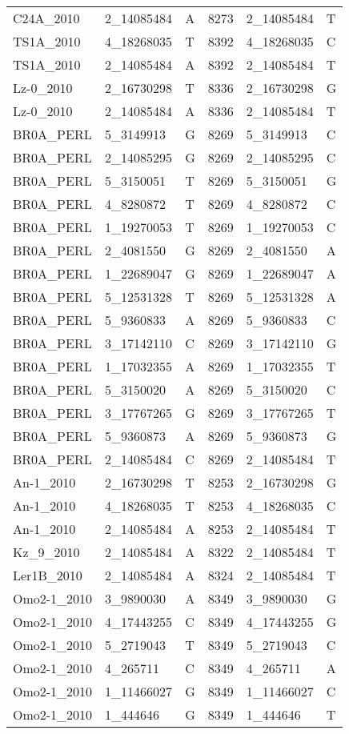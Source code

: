\begin{center}
\begin{longtable}{|l|l|l|l|l|l|}
C24A\_2010&2\_14085484&A&8273&2\_14085484&T\\
TS1A\_2010&4\_18268035&T&8392&4\_18268035&C\\
TS1A\_2010&2\_14085484&A&8392&2\_14085484&T\\
Lz-0\_2010&2\_16730298&T&8336&2\_16730298&G\\
Lz-0\_2010&2\_14085484&A&8336&2\_14085484&T\\
BR0A\_PERL&5\_3149913&G&8269&5\_3149913&C\\
BR0A\_PERL&2\_14085295&G&8269&2\_14085295&C\\
BR0A\_PERL&5\_3150051&T&8269&5\_3150051&G\\
BR0A\_PERL&4\_8280872&T&8269&4\_8280872&C\\
BR0A\_PERL&1\_19270053&T&8269&1\_19270053&C\\
BR0A\_PERL&2\_4081550&G&8269&2\_4081550&A\\
BR0A\_PERL&1\_22689047&G&8269&1\_22689047&A\\
BR0A\_PERL&5\_12531328&T&8269&5\_12531328&A\\
BR0A\_PERL&5\_9360833&A&8269&5\_9360833&C\\
BR0A\_PERL&3\_17142110&C&8269&3\_17142110&G\\
BR0A\_PERL&1\_17032355&A&8269&1\_17032355&T\\
BR0A\_PERL&5\_3150020&A&8269&5\_3150020&C\\
BR0A\_PERL&3\_17767265&G&8269&3\_17767265&T\\
BR0A\_PERL&5\_9360873&A&8269&5\_9360873&G\\
BR0A\_PERL&2\_14085484&C&8269&2\_14085484&T\\
An-1\_2010&2\_16730298&T&8253&2\_16730298&G\\
An-1\_2010&4\_18268035&T&8253&4\_18268035&C\\
An-1\_2010&2\_14085484&A&8253&2\_14085484&T\\
Kz\_9\_2010&2\_14085484&A&8322&2\_14085484&T\\
Ler1B\_2010&2\_14085484&A&8324&2\_14085484&T\\
Omo2-1\_2010&3\_9890030&A&8349&3\_9890030&G\\
Omo2-1\_2010&4\_17443255&C&8349&4\_17443255&G\\
Omo2-1\_2010&5\_2719043&T&8349&5\_2719043&C\\
Omo2-1\_2010&4\_265711&C&8349&4\_265711&A\\
Omo2-1\_2010&1\_11466027&G&8349&1\_11466027&C\\
Omo2-1\_2010&1\_444646&G&8349&1\_444646&T\\

\end{longtable}
\end{center}
